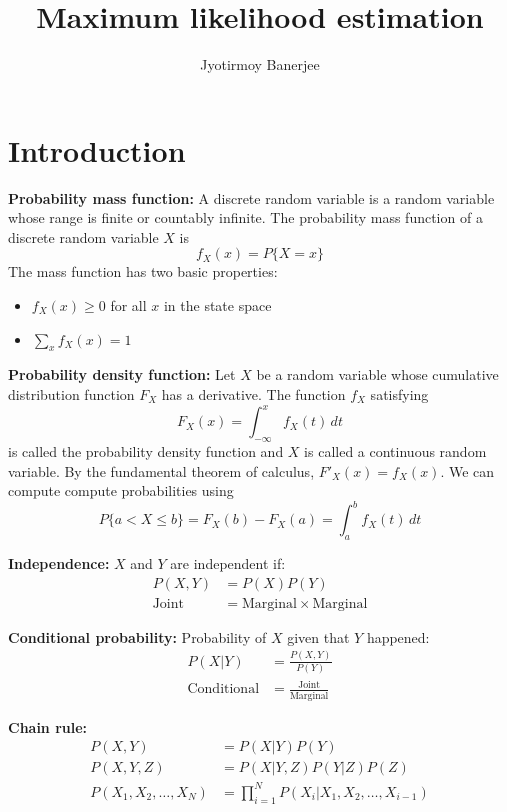 \documentclass{article}
\title{Maximum likelihood estimation}
\author{Jyotirmoy Banerjee}
\begin{document}
\maketitle

\section{Introduction}
\textbf{Probability mass function:} 
A discrete random variable is a random variable whose range is finite or countably infinite. The probability mass function of a discrete random variable $X$ is 
\[ f_X(x) = P\{X=x\}\]
The mass function has two basic properties:
\begin{itemize}
\item $f_X(x) \geq 0$ for all $x$ in the state space
\item $\sum_x f_X(x) = 1$
\end{itemize}

\noindent
\textbf{Probability density function:} Let $X$ be  a  random  variable  whose  cumulative distribution function $F_X$ has a derivative. The  function $f_X$ satisfying
\[ F_X(x) = \int _{-\infty }^{x}f_{X}(t)\,dt \]
is called the probability density function and $X$ is called a continuous random variable.
By the fundamental theorem of calculus, ${F}'_X(x) = f_X(x)$. We can compute compute probabilities using
\[P\{a < X \leq b\} = F_X(b) - F_X(a) = \int _{a}^{b}f_{X}(t)\,dt\] 

\noindent
\textbf{Independence:} $X$ and $Y$ are independent if:
\begin{align*}
P(X,Y) &= P(X)P(Y) \\
\text{Joint} &= \text{Marginal} \times \text{Marginal}
\end{align*}

\noindent
\textbf{Conditional probability:} Probability of $X$ given that $Y$ happened:
\begin{align*}
P(X \vert Y) &= \frac{P(X,Y)}{P(Y)} \\
\text{Conditional} &= \frac{\text{Joint}}{\text{Marginal}}
\end{align*}

\noindent
\textbf{Chain rule:} 
\begin{align*}
P(X,Y) &= P(X \vert Y)P(Y) \\
P(X, Y, Z) &= P(X \vert Y, Z) P(Y \vert Z) P(Z) \\
P(X_1,X_2,\dots,X_N) &= \prod_{i=1}^{N}P(X_i \vert X_1,X_2,\dots,X_{i-1})
\end{align*}
\end{document}
